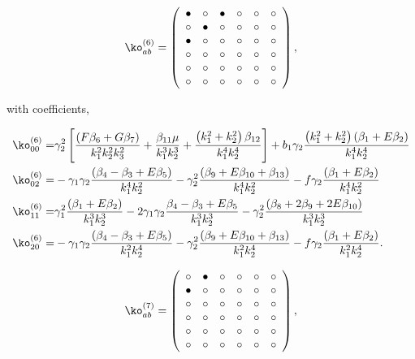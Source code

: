 {\begin{equation}
	\ko^{(6)}_{ab} = 
 \left( \begin {array}{cccccc} \bullet &\circ &\bullet &\circ 
&\circ &\circ \\  \circ &\bullet &\circ &
\circ &\circ &\circ \\  \bullet &\circ &
\circ &\circ &\circ &\circ \\  \circ &
\circ &\circ &\circ &\circ &\circ \\  
\circ &\circ &\circ &\circ &\circ &\circ 
\\  \circ &\circ &\circ &\circ &\circ &
\circ \end {array} \right), 
\end{equation}

with coefficients, 

\begin{align*}
\ko_{00}^{(6)}=& \gamma_2^2 \left[ \frac{\left( F \beta_{6} + G \beta_{7} \right)}{k_1^2 k_2^2 k_3^2} + \frac{\beta_{11} \mu}{k_1^3 k_2^3} + \frac{\left( k_1^2 + k_2^2 \right) \beta_{12}}{k_1^4 k_2^4} \right] + b_1 \gamma_2 \frac{\left( k_1^2 + k_2^2\right) \left( \beta_1 + E \beta_2 \right)}{k_1^4 k_2^4}\\
\ko_{02}^{(6)}=& - \gamma_1 \gamma_2 \frac{\left( {\beta_{4}-\beta_{3}} + E \beta_{5} \right)}{k_1^4 k_2^2} - \gamma_2^2 \frac{\left( \beta_{9} + E \beta_{10} + \beta_{13} \right)}{k_1^4 k_2^2} - f \gamma_2 \frac{\left( \beta_1 + E \beta_2 \right)}{k_1^4 k_2^2} \\
\ko_{11}^{(6)}=& \gamma_1^2 \frac{\left( \beta_1 + E \beta_2 \right)}{k_1^3 k_2^3} - 2 \gamma_1 \gamma_2 \frac{{\beta_{4}-\beta_{3}} + E \beta_{5}}{k_1^3 k_2^3} - \gamma_2^2 \frac{\left( \beta_{8} + 2 \beta_{9} + 2 E \beta_{10} \right)}{k_1^3 k_2^3} \\
\ko_{20}^{(6)}=& - \gamma_1 \gamma_2 \frac{\left( {\beta_{4}-\beta_{3}} + E \beta_{5} \right)}{k_1^2 k_2^4} - \gamma_2^2 \frac{\left( \beta_{9} + E \beta_{10} + \beta_{13} \right)}{k_1^2 k_2^4} - f \gamma_2 \frac{\left( \beta_1 + E \beta_2 \right)}{k_1^2 k_2^4} .
\end{align*}

\begin{equation}
	\ko^{(7)}_{ab}= 
 \left( \begin {array}{cccccc} \circ &\bullet &\circ &\circ &
\circ &\circ \\  \bullet &\circ &\circ &
\circ &\circ &\circ \\  \circ &\circ &
\circ &\circ &\circ &\circ \\  \circ &
\circ &\circ &\circ &\circ &\circ \\  
\circ &\circ &\circ &\circ &\circ &\circ 
\\  \circ &\circ &\circ &\circ &\circ &
\circ \end {array} \right), 
\end{equation}

}
